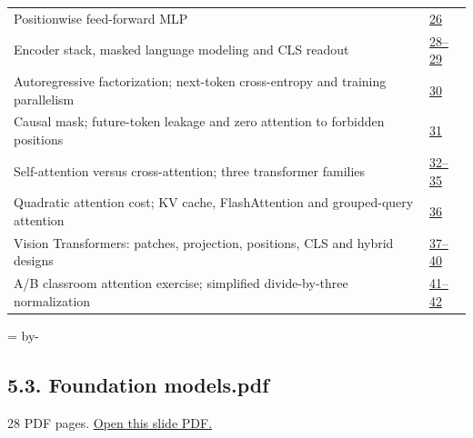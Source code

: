 \documentclass[10pt]{article}
\newcommand{\deckheading}[1]{\par\begingroup\skip0=\pagegoal\advance\skip0 by-\pagetotal\ifdim\skip0<7\baselineskip\newpage\fi\endgroup\subsection{#1}}
\begin{document}
\begin{longtable}{@{}P{.79\linewidth}P{.17\linewidth}@{}}
Positionwise feed-forward MLP & \href{../Lecture\%20Slides/5.2.\%20Transformers.pdf\#page=26}{26}\\[3pt]
Encoder stack, masked language modeling and CLS readout & \href{../Lecture\%20Slides/5.2.\%20Transformers.pdf\#page=28}{28--29}\\[3pt]
Autoregressive factorization; next-token cross-entropy and training parallelism & \href{../Lecture\%20Slides/5.2.\%20Transformers.pdf\#page=30}{30}\\[3pt]
Causal mask; future-token leakage and zero attention to forbidden positions & \href{../Lecture\%20Slides/5.2.\%20Transformers.pdf\#page=31}{31}\\[3pt]
Self-attention versus cross-attention; three transformer families & \href{../Lecture\%20Slides/5.2.\%20Transformers.pdf\#page=32}{32--35}\\[3pt]
Quadratic attention cost; KV cache, FlashAttention and grouped-query attention & \href{../Lecture\%20Slides/5.2.\%20Transformers.pdf\#page=36}{36}\\[3pt]
Vision Transformers: patches, projection, positions, CLS and hybrid designs & \href{../Lecture\%20Slides/5.2.\%20Transformers.pdf\#page=37}{37--40}\\[3pt]
A/B classroom attention exercise; simplified divide-by-three normalization & \href{../Lecture\%20Slides/5.2.\%20Transformers.pdf\#page=41}{41--42}\\[3pt]
\bottomrule\end{longtable}
\deckheading{5.3. Foundation models.pdf}
{\small 28 PDF pages. \href{../Lecture\%20Slides/5.3.\%20Foundation\%20models.pdf}{Open this slide PDF.}}\par
\end{document}
